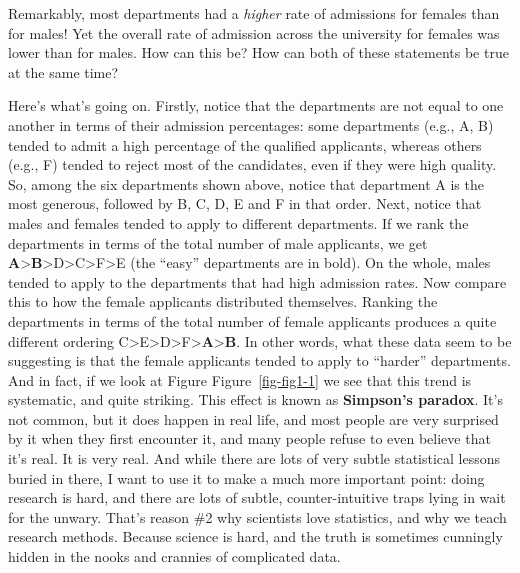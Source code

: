 \documentclass[
  letterpaper,
]{book}
\begin{document}
Remarkably, most departments had a \emph{higher} rate of admissions for
females than for males! Yet the overall rate of admission across the
university for females was lower than for males. How can this be? How
can both of these statements be true at the same time?

Here's what's going on. Firstly, notice that the departments are not
equal to one another in terms of their admission percentages: some
departments (e.g., A, B) tended to admit a high percentage of the
qualified applicants, whereas others (e.g., F) tended to reject most of
the candidates, even if they were high quality. So, among the six
departments shown above, notice that department A is the most generous,
followed by B, C, D, E and F in that order. Next, notice that males and
females tended to apply to different departments. If we rank the
departments in terms of the total number of male applicants, we get
\textbf{A}\textgreater{}\textbf{B}\textgreater D\textgreater C\textgreater F\textgreater E
(the ``easy'' departments are in bold). On the whole, males tended to
apply to the departments that had high admission rates. Now compare this
to how the female applicants distributed themselves. Ranking the
departments in terms of the total number of female applicants produces a
quite different ordering
C\textgreater E\textgreater D\textgreater F\textgreater{}\textbf{A}\textgreater{}\textbf{B}.
In other words, what these data seem to be suggesting is that the female
applicants tended to apply to ``harder'' departments. And in fact, if we
look at Figure Figure~\ref{fig-fig1-1} we see that this trend is
systematic, and quite striking. This effect is known as
\textbf{Simpson's paradox}. It's not common, but it does happen in real
life, and most people are very surprised by it when they first encounter
it, and many people refuse to even believe that it's real. It is very
real. And while there are lots of very subtle statistical lessons buried
in there, I want to use it to make a much more important point: doing
research is hard, and there are lots of subtle, counter-intuitive traps
lying in wait for the unwary. That's reason \#2 why scientists love
statistics, and why we teach research methods. Because science is hard,
and the truth is sometimes cunningly hidden in the nooks and crannies of
complicated data.
\end{document}
